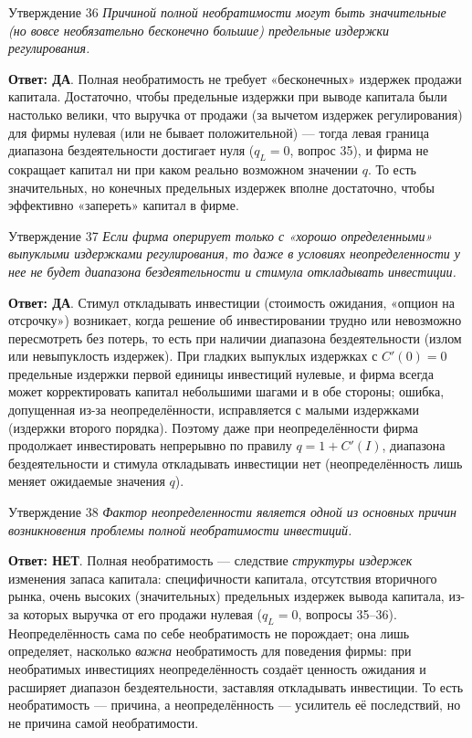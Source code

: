 \documentclass[10pt,a4paper]{article}
\newcommand{\qda}{\textbf{\color{yesgreen}Ответ: ДА}}
\newcommand{\qnet}{\textbf{\color{nored}Ответ: НЕТ}}
\newenvironment{answer}[2]{%
  \begin{qbox}{Утверждение #1}
  \textit{#2}\par\smallskip
}{%
  \end{qbox}\vspace{2pt}
}
\begin{document}
\begin{answer}{36}{Причиной полной необратимости могут быть значительные (но вовсе необязательно бесконечно большие) предельные издержки регулирования.}
\qda. Полная необратимость не требует «бесконечных» издержек продажи капитала. Достаточно, чтобы предельные издержки при выводе капитала были настолько велики, что выручка от продажи (за вычетом издержек регулирования) для фирмы нулевая (или не бывает положительной) --- тогда левая граница диапазона бездеятельности достигает нуля ($q_L=0$, вопрос 35), и фирма не сокращает капитал ни при каком реально возможном значении $q$. То есть значительных, но конечных предельных издержек вполне достаточно, чтобы эффективно «запереть» капитал в фирме.
\end{answer}

\begin{answer}{37}{Если фирма оперирует только с «хорошо определенными» выпуклыми издержками регулирования, то даже в условиях неопределенности у нее не будет диапазона бездеятельности и стимула откладывать инвестиции.}
\qda. Стимул откладывать инвестиции (стоимость ожидания, «опцион на отсрочку») возникает, когда решение об инвестировании трудно или невозможно пересмотреть без потерь, то есть при наличии диапазона бездеятельности (излом или невыпуклость издержек). При гладких выпуклых издержках с $C'(0)=0$ предельные издержки первой единицы инвестиций нулевые, и фирма всегда может корректировать капитал небольшими шагами и в обе стороны; ошибка, допущенная из-за неопределённости, исправляется с малыми издержками (издержки второго порядка). Поэтому даже при неопределённости фирма продолжает инвестировать непрерывно по правилу $q=1+C'(I)$, диапазона бездеятельности и стимула откладывать инвестиции нет (неопределённость лишь меняет ожидаемые значения $q$).
\end{answer}

\begin{answer}{38}{Фактор неопределенности является одной из основных причин возникновения проблемы полной необратимости инвестиций.}
\qnet. Полная необратимость --- следствие \emph{структуры издержек} изменения запаса капитала: специфичности капитала, отсутствия вторичного рынка, очень высоких (значительных) предельных издержек вывода капитала, из-за которых выручка от его продажи нулевая ($q_L=0$, вопросы 35--36). Неопределённость сама по себе необратимость не порождает; она лишь определяет, насколько \emph{важна} необратимость для поведения фирмы: при необратимых инвестициях неопределённость создаёт ценность ожидания и расширяет диапазон бездеятельности, заставляя откладывать инвестиции. То есть необратимость --- причина, а неопределённость --- усилитель её последствий, но не причина самой необратимости.
\end{answer}
\end{document}
